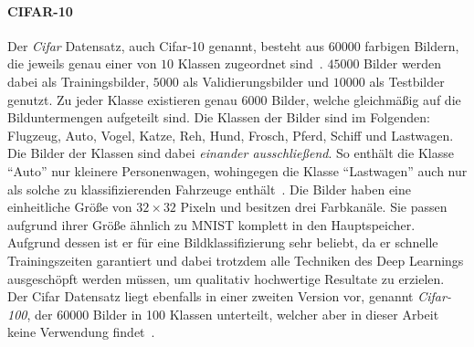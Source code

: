 \paragraph{CIFAR-10}
\label{cifar_10}

Der \emph{\gls{Cifar}} Datensatz, auch \gls{Cifar}-10 genannt, besteht aus $60000$ farbigen Bildern, die jeweils genau einer von $10$ Klassen zugeordnet sind~\cite{cifar_10}.
$45000$ Bilder werden dabei als Trainingsbilder, $5000$ als Validierungsbilder und $10000$ als Testbilder genutzt.
Zu jeder Klasse existieren genau $6000$ Bilder, welche gleichmäßig auf die Bilduntermengen aufgeteilt sind.
Die Klassen der Bilder sind im Folgenden: Flugzeug, Auto, Vogel, Katze, Reh, Hund, Frosch, Pferd, Schiff und Lastwagen.
Die Bilder der Klassen sind dabei \emph{einander ausschließend}.
So enthält die Klasse \enquote{Auto} nur kleinere Personenwagen, wohingegen die Klasse \enquote{Lastwagen} auch nur als solche zu klassifizierenden Fahrzeuge enthält~\cite{cifar_10}.
Die Bilder haben eine einheitliche Größe von $32 \times 32$ Pixeln und besitzen drei Farbkanäle.
Sie passen aufgrund ihrer Größe ähnlich zu \gls{MNIST} komplett in den Hauptspeicher.
Aufgrund dessen ist er für eine Bildklassifizierung sehr beliebt, da er schnelle Trainingszeiten garantiert und dabei trotzdem alle Techniken des Deep Learnings ausgeschöpft werden müssen, um qualitativ hochwertige Resultate zu erzielen.
Der \gls{Cifar} Datensatz liegt ebenfalls in einer zweiten Version vor, genannt \emph{\gls{Cifar}-100}, der 60000 Bilder in 100 Klassen unterteilt, welcher aber in dieser Arbeit keine Verwendung findet~\cite{cifar_10}.

